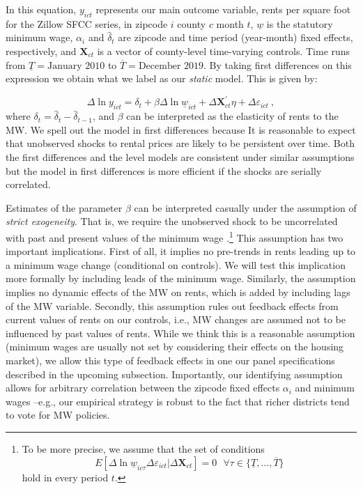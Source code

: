 In this equation, $y_{ict}$ represents our main outcome variable, rents per square foot 
for the Zillow SFCC series, in zipcode $i$ county $c$ month $t$, $\underline{w}$ is the 
statutory minimum wage, $\alpha_i$ and $\hat{\delta}_t$ are zipcode and time period (year-month) 
fixed effects, respectively, and $\mathbf{X}_{ct}$ is a vector of county-level time-varying 
controls. Time runs from $\underline{T} = \text{January 2010}$ to $\overline{T} = 
\text{December 2019}$. By taking first differences on this expression we obtain what 
we label as our \textit{static} model. This is given by:
    
\begin{equation}\label{eq:did}
	\Delta \ln y_{ict} = \delta_t
						+ \beta \Delta \ln \underline{w}_{ict}
						+ \Delta \mathbf{X}^{'}_{ct} \eta
						+ \Delta \varepsilon_{ict} \ ,
\end{equation}
where $\delta_t = \hat{\delta}_t - \hat{\delta}_{t-1}$, and $\beta$ can be interpreted 
as the elasticity of rents to the MW. We spell out the model in first differences because 
It is reasonable to expect that unobserved shocks to rental prices are likely to be persistent over 
time. Both the first differences and the level models are consistent under similar assumptions 
but the model in first differences is more efficient if the shocks are serially correlated.

Estimates of the parameter $\beta$ can be interpreted casually under the assumption of
\textit{strict exogeneity}. That is, we require the unobserved shock to be uncorrelated
with past and present values of the minimum wage \parencite[][chapter 10]
{wooldridge2010}.\footnote{To be more precise, we assume that the set of conditions 
	$$E[\Delta \ln \underline{w}_{ic\tau} \Delta \varepsilon_{ict} | \Delta \mathbf{X}_{ct}] = 0
	\ \ \ \forall \tau \in \{\underline{T}, ..., \overline{T}\}$$
	hold in every period $t$.}
This assumption has two important implications. First of all, it implies no pre-trends in 
rents leading up to a minimum wage change (conditional on controls). We will test this 
implication more formally by including leads of the minimum wage. Similarly, the assumption 
implies no dynamic effects of the MW on rents, which is added by including lags of the 
MW variable. Secondly, this assumption rules out feedback effects from current values of rents 
on our controls, i.e., MW changes are assumed not to be influenced by past values of rents. 
While we think this is a reasonable assumption (minimum wages are usually not set by considering 
their effects on the housing market), we allow this type of feedback effects in one our panel 
specifications described in the upcoming subsection. Importantly, our identifying assumption 
allows for arbitrary correlation between the zipcode fixed effects $\alpha_i$ and minimum wages 
--e.g., our empirical strategy is robust to the fact that richer districts tend to vote for 
MW policies.


